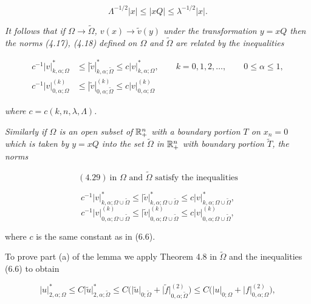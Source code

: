 \[
\Lambda^{-1/2}|x| \le |xQ| \le \lambda^{-1/2}|x|.
\]

\emph{It follows that if $\Omega \to \tilde \Omega$, $v(x)\to \tilde v(y)$ under the transformation $y=xQ$ then the norms (4.17), (4.18) defined on $\Omega$ and $\tilde \Omega$ are related by the inequalities}

\[
\begin{aligned}
c^{-1}|v|_{k,\alpha;\Omega}^* &\le |\tilde v|_{k,\alpha;\tilde \Omega}^* \le c|v|_{k,\alpha;\Omega}^*, \qquad k=0,1,2,\ldots,\qquad 0\le \alpha \le 1, \\
c^{-1}|v|_{0,\alpha;\Omega}^{(k)} &\le |\tilde v|_{0,\alpha;\tilde \Omega}^{(k)} \le c|v|_{0,\alpha;\Omega}^{(k)}
\end{aligned}
\]

\emph{where $c=c(k,n,\lambda,\Lambda)$.}

\medskip

\emph{Similarly if $\Omega$ is an open subset of $\mathbb{R}^n_+$ with a boundary portion $T$ on $x_n=0$ which is taken by $y=xQ$ into the set $\tilde \Omega$ in $\mathbb{R}^n_+$ with boundary portion $\tilde T$, the norms}



\[
(4.29)\ \text{in }\Omega\text{ and }\widetilde{\Omega}\text{ satisfy the inequalities}
\]

\begin{equation}\tag{6.7}
c^{-1}\lvert v\rvert^{*}_{k,\alpha;\Omega\cup\widetilde{\Omega}}
\leq \lvert \widetilde{v}\rvert^{*}_{k,\alpha;\Omega\cup\widetilde{\Omega}}
\leq c\lvert v\rvert^{*}_{k,\alpha;\Omega\cup\widetilde{\Omega}},
\end{equation}
\begin{equation*}
c^{-1}\lvert v\rvert^{(k)}_{0,\alpha;\Omega\cup\widetilde{\Omega}}
\leq \lvert \widetilde{v}\rvert^{(k)}_{0,\alpha;\Omega\cup\widetilde{\Omega}}
\leq c\lvert v\rvert^{(k)}_{0,\alpha;\Omega\cup\widetilde{\Omega}},
\end{equation*}

where $c$ is the same constant as in (6.6).

To prove part (a) of the lemma we apply Theorem 4.8 in $\widetilde{\Omega}$ and the inequalities
(6.6) to obtain

\[
\lvert u\rvert^{*}_{2,\alpha;\Omega}
\leq C\lvert \widetilde{u}\rvert^{*}_{2,\alpha;\widetilde{\Omega}}
\leq C\bigl(\lvert \widetilde{u}\rvert_{0;\widetilde{\Omega}}
+\lvert \widetilde{f}\rvert^{(2)}_{0,\alpha;\widetilde{\Omega}}\bigr)
\leq C\bigl(\lvert u\rvert_{0;\Omega}
+\lvert f\rvert^{(2)}_{0,\alpha;\Omega}\bigr),
\]

